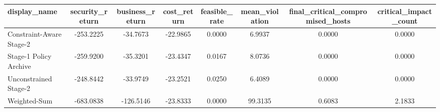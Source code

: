 \begin{tabular}{@{}lccccccc@{}}
\toprule
display_name & security_return & business_return & cost_return & feasible_rate & mean_violation & final_critical_compromised_hosts & critical_impact_count \\
\midrule
Constraint-Aware Stage-2 & -253.2225 & -34.7673 & -22.9865 & 0.0000 & 6.9937 & 0.0000 & 0.0000 \\
Stage-1 Policy Archive & -259.9200 & -35.3201 & -23.4347 & 0.0167 & 8.0736 & 0.0000 & 0.0000 \\
Unconstrained Stage-2 & -248.8442 & -33.9749 & -23.2521 & 0.0250 & 6.4089 & 0.0000 & 0.0000 \\
Weighted-Sum & -683.0838 & -126.5146 & -23.8333 & 0.0000 & 99.3135 & 0.6083 & 2.1833 \\
\bottomrule
\end{tabular}